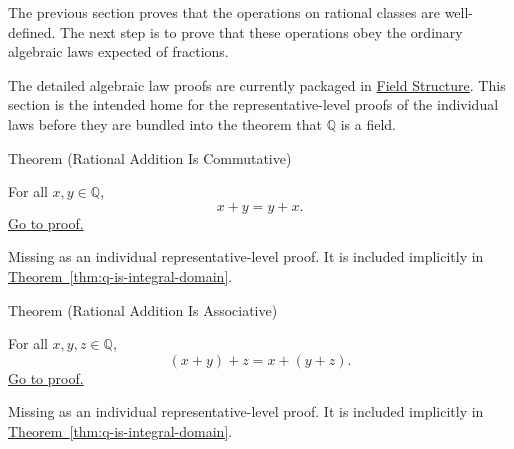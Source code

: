 
\label{sec:algebraic-laws-rational-arithmetic}

\begin{exposition}
The previous section proves that the operations on rational classes are well-defined.  The next step is to prove that these operations obey the ordinary algebraic laws expected of fractions.
\end{exposition}

\begin{remark*}
The detailed algebraic law proofs are currently packaged in
\hyperref[sec:field-structure-q]{Field Structure}.  This section is the intended home for the representative-level proofs of the individual laws before they are bundled into the theorem that $\mathbb{Q}$ is a field.
\end{remark*}

\begin{theorembox}{Theorem (Rational Addition Is Commutative)}
\begin{theorem}
\label{thm:rational-addition-commutative}
For all $x,y\in\mathbb{Q}$,
\[
x+y=y+x.
\]
\hyperref[prf:rational-addition-commutative]{Go to proof.}
\end{theorem}
\end{theorembox}

\begin{remark*}[Status]
Missing as an individual representative-level proof. It is included implicitly in \hyperref[thm:q-is-integral-domain]{Theorem~\ref*{thm:q-is-integral-domain}}.
\end{remark*}

\begin{theorembox}{Theorem (Rational Addition Is Associative)}
\begin{theorem}
\label{thm:rational-addition-associative}
For all $x,y,z\in\mathbb{Q}$,
\[
(x+y)+z=x+(y+z).
\]
\hyperref[prf:rational-addition-associative]{Go to proof.}
\end{theorem}
\end{theorembox}

\begin{remark*}[Status]
Missing as an individual representative-level proof. It is included implicitly in \hyperref[thm:q-is-integral-domain]{Theorem~\ref*{thm:q-is-integral-domain}}.
\end{remark*}

